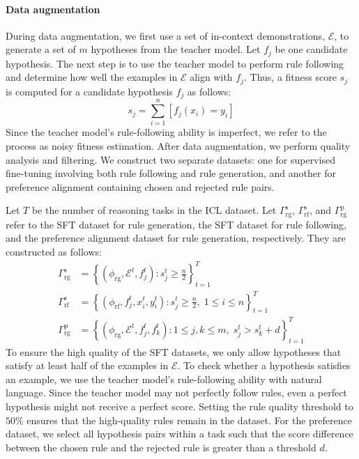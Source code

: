 \paragraph{Data augmentation} 
During data augmentation, we first use a set of in-context demonstrations, $\mathcal{E}$, to generate a set of $m$ hypotheses from the teacher model. Let $f_j$ be one candidate hypothesis. The next step is to use the teacher model to perform rule following and determine how well the examples in $\mathcal{E}$ align with $f_j$. Thus, a fitness score $s_j$ is computed for a candidate hypothesis $f_j$ as follows:
\begin{equation*}
    s_j = \sum_{i=1}^n [f_j(x_i) = y_i]
\end{equation*}
Since the teacher model's rule-following ability is imperfect, we refer to the process as noisy fitness estimation. After data augmentation, we perform quality analysis and filtering. We construct two separate datasets: one for supervised fine-tuning involving both rule following and rule generation, and another for preference alignment containing chosen and rejected rule pairs.

Let $T$ be the number of reasoning tasks in the ICL dataset. Let $\Gamma_{\mathrm{rg}}^{\mathrm{s}}$, $\Gamma_{\mathrm{rf}}^{\mathrm{s}}$, and $\Gamma_{\mathrm{rg}}^{\mathrm{p}}$ refer to the SFT dataset for rule generation, the SFT dataset for rule following, and the preference alignment dataset for rule generation, respectively. They are constructed as follows:
\begin{align*}
    \Gamma_{\mathrm{rg}}^{\mathrm{s}} &= \left\{ (\phi_{\mathrm{rg}}, \mathcal{E}^t, f_j^t) : s_j^t \geq \tfrac{n}{2} \right\}_{t=1}^T \\
    \Gamma_{\mathrm{rf}}^{\mathrm{s}} &= \left\{ (\phi_{\mathrm{rf}}, f_j^t, x_i^t, y_i^t) : s_j^t \geq \tfrac{n}{2},\; 1 \leq i \leq n \right\}_{t=1}^T \\
    \Gamma_{\mathrm{rg}}^{\mathrm{p}} &= \left\{ (\phi_{\mathrm{rg}}, \mathcal{E}^t, f_j^t, f_k^t) : 1 \leq j,k \leq m,\; s_j^t > s_k^t + d \right\}_{t=1}^T
\end{align*}
To ensure the high quality of the SFT datasets, we only allow hypotheses that satisfy at least half of the examples in $\mathcal{E}$. To check whether a hypothesis satisfies an example, we use the teacher model's rule-following ability with natural language. Since the teacher model may not perfectly follow rules, even a perfect hypothesis might not receive a perfect score. Setting the rule quality threshold to $50\%$ ensures that the high-quality rules remain in the dataset. For the preference dataset, we select all hypothesis pairs within a task such that the score difference between the chosen rule and the rejected rule is greater than a threshold $d$.

